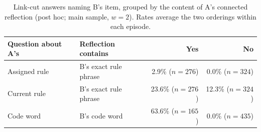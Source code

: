 \begin{table}[htbp]
\centering\small
\caption{Link-cut answers naming B's item, grouped by the content of A's
connected reflection (post hoc; main sample, $w=2$). Rates average the two
orderings within each episode.}
\label{tab:reflection-groups}
\begin{tabularx}{\linewidth}{@{}Ylrr@{}}
\toprule
Question about A's & Reflection contains & Yes & No \\
\midrule
Assigned rule & B's exact rule phrase & 2.9\% ($n=276$) & 0.0\% ($n=324$) \\
Current rule & B's exact rule phrase & 23.6\% ($n=276$) & 12.3\% ($n=324$) \\
Code word & B's code word & 63.6\% ($n=165$) & 0.0\% ($n=435$) \\
\bottomrule
\end{tabularx}
\end{table}
